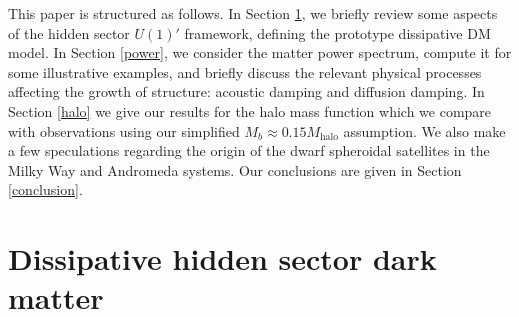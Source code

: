 \documentclass[12pt]{article}
\begin{document}
This paper is structured as follows. In Section \ref{dissipative}, we briefly review some aspects of the hidden 
sector $U(1)'$ framework, defining the prototype dissipative DM model. In Section \ref{power}, we consider the matter power spectrum, compute it for some illustrative examples, 
and briefly discuss the relevant physical processes affecting the growth of structure: acoustic damping 
and diffusion damping. In Section \ref{halo} we give our results for the halo mass function which 
we compare with observations using our simplified $M_b \approx 0.15M_{\text{halo}}$ assumption. We also make a 
few speculations regarding the origin of the dwarf spheroidal satellites in the Milky Way and Andromeda systems. 
Our conclusions are given in Section \ref{conclusion}.

\section{Dissipative hidden sector dark matter}
\label{dissipative}
\end{document}
